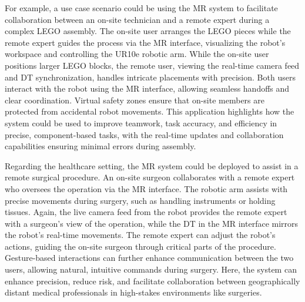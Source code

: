 For example, a use case scenario could be using the \ac{MR} system to facilitate collaboration between an on-site technician and a remote expert during a complex LEGO assembly. The on-site user arranges the LEGO pieces while the remote expert guides the process via the \ac{MR} interface, visualizing the robot’s workspace and controlling the UR10e robotic arm. While the on-site user positions larger LEGO blocks, the remote user, viewing the real-time camera feed and \ac{DT} synchronization, handles intricate placements with precision. Both users interact with the robot using the \ac{MR} interface, allowing seamless handoffs and clear coordination. Virtual safety zones ensure that on-site members are protected from accidental robot movements. This application highlights how the system could be used to improve teamwork, task accuracy, and efficiency in precise, component-based tasks, with the real-time updates and collaboration capabilities ensuring minimal errors during assembly.

Regarding the healthcare setting, the \ac{MR} system could be deployed to assist in a remote surgical procedure. An on-site surgeon collaborates with a remote expert who oversees the operation via the \ac{MR} interface. The robotic arm assists with precise movements during surgery, such as handling instruments or holding tissues. Again, the live camera feed from the robot provides the remote expert with a surgeon’s view of the operation, while the \ac{DT} in the \ac{MR} interface mirrors the robot's real-time movements. The remote expert can adjust the robot’s actions, guiding the on-site surgeon through critical parts of the procedure. Gesture-based interactions can further enhance communication between the two users, allowing natural, intuitive commands during surgery. Here, the system can enhance precision, reduce risk, and facilitate collaboration between geographically distant medical professionals in high-stakes environments like surgeries.










